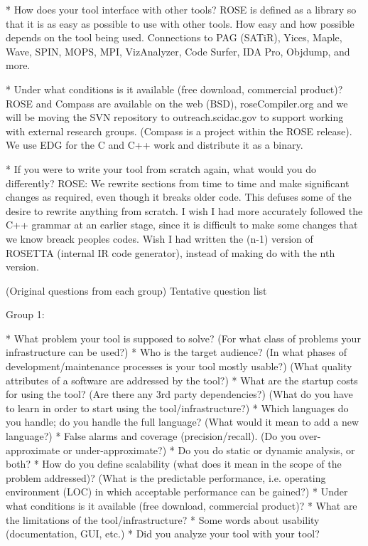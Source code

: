 {    * How does your tool interface with other tools?
      ROSE is defined as a library so that it is as easy as possible to use with other
         tools.  How easy and how possible depends on the tool being used. Connections 
         to PAG (SATiR), Yices, Maple, Wave, SPIN, MOPS, MPI, VizAnalyzer, Code Surfer,
         IDA Pro, Objdump, and more.

    * Under what conditions is it available (free download, commercial product)?
      ROSE and Compass are available on the web (BSD), roseCompiler.org and we will
         be moving the SVN repository to outreach.scidac.gov to support working with
         external research groups. (Compass is a project within the ROSE release).
         We use EDG for the C and C++ work and distribute it as a binary.

    * If you were to write your tool from scratch again, what would you do differently?
      ROSE: We rewrite sections from time to time and make significant changes as 
         required, even though it breaks older code.  This defuses some of the desire
         to rewrite anything from scratch.  I wish I had more accurately followed
         the C++ grammar at an earlier stage, since it is difficult to make some 
         changes that we know breack peoples codes.  Wish I had written the (n-1)
         version of ROSETTA (internal IR code generator), instead of making do 
         with the nth version.

(Original questions from each group) Tentative question list

Group 1:

    * What problem your tool is supposed to solve? (For what class of problems your infrastructure can be used?)
    * Who is the target audience? (In what phases of development/maintenance processes is your tool mostly usable?) (What quality attributes of a software are addressed by the tool?)
    * What are the startup costs for using the tool? (Are there any 3rd party dependencies?) (What do you have to learn in order to start using the tool/infrastructure?)
    * Which languages do you handle; do you handle the full language? (What would it mean to add a new language?)
    * False alarms and coverage (precision/recall). (Do you over-approximate or under-approximate?)
    * Do you do static or dynamic analysis, or both?
    * How do you define scalability (what does it mean in the scope of the problem addressed)? (What is the predictable performance, i.e. operating environment (LOC) in which acceptable performance can be gained?)
    * Under what conditions is it available (free download, commercial product)?
    * What are the limitations of the tool/infrastructure?
    * Some words about usability (documentation, GUI, etc.)
    * Did you analyze your tool with your tool? 

}
